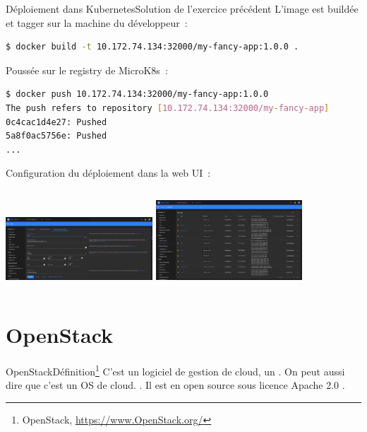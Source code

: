 \documentclass{beamer}
\begin{document}
    \begin{frame}[fragile]{Déploiement dans Kubernetes}{Solution de l'exercice précédent}
        L'image est buildée et tagger sur la machine du développeur~:
        \begin{lstlisting}[language=bash]
$ docker build -t 10.172.74.134:32000/my-fancy-app:1.0.0 .
        \end{lstlisting}
        Poussée sur le registry de MicroK8s~:
        \begin{lstlisting}[language=bash]
$ docker push 10.172.74.134:32000/my-fancy-app:1.0.0
The push refers to repository [10.172.74.134:32000/my-fancy-app]
0c4cac1d4e27: Pushed
5a8f0ac5756e: Pushed
...
        \end{lstlisting}
        Configuration du déploiement dans la web UI~:
        \begin{columns}
            \centering
            \includegraphics[width=5.5cm]{image/k8s-deployment-configuration}
            \centering
            \includegraphics[width=5.5cm]{image/k8s-services}
        \end{columns}
    \end{frame}


    \section{OpenStack}\label{sec:openstack}

    \begin{frame}{OpenStack}{Définition\footnote{\label{OpenStackhome}OpenStack, \url{https://www.OpenStack.org/}}}
        C'est un logiciel de gestion de cloud, un .
        On peut aussi dire que c'est un OS de cloud.
        \bigbreak
        \bigbreak
        .
        \bigbreak
        \bigbreak
        Il est en open source sous licence Apache 2.0 .
    \end{frame}
\end{document}
